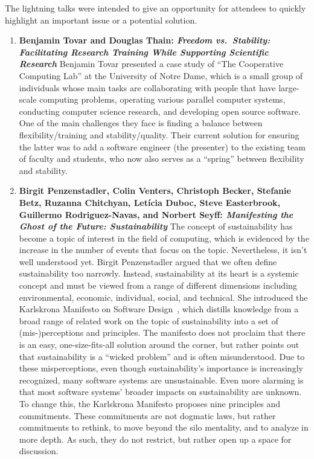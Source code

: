 \documentclass[11pt, oneside]{amsart}
\begin{document}
The lightning talks were intended to give an opportunity for attendees to
quickly highlight an important issue or a potential solution.
%
\begin{enumerate}
\item \textbf{Benjamin Tovar and Douglas Thain: \textit{Freedom vs.\ Stability:
Facilitating Research Training While Supporting Scientific Research}} Benjamin
Tovar presented a case study of ``The Cooperative Computing Lab'' at the
University of Notre Dame, which is a small group of individuals whose main tasks
are collaborating with people that have large-scale computing problems,
operating various parallel computer systems, conducting computer science
research, and developing open source software. One of the main challenges they
face is finding a balance between flexibility/training and stability/quality.
Their current solution for ensuring the latter was to add a software engineer
(the presenter) to the existing team of faculty and students, who now also
serves as a ``spring'' between flexibility and stability.

\item \textbf{Birgit Penzenstadler, Colin Venters, Christoph Becker, Stefanie
Betz, Ruzanna Chitchyan, Let\'{i}cia Duboc, Steve Easterbrook, Guillermo
Rodriguez-Navas, and Norbert Seyff: \textit{Manifesting the Ghost of the Future:
Sustainability}} The concept of sustainability has become a topic of interest in
the field of computing, which is evidenced by the increase in the number of
events that focus on the topic. Nevertheless, it isn't well understood yet.
Birgit Penzenstadler argued that we often define sustainability too narrowly.
Instead, sustainability at its heart is a systemic concept and must be viewed
from a range of different dimensions including environmental, economic,
individual, social, and technical. She introduced the Karlskrona Manifesto on
Software Design~\cite{Becker:2014}, which distills knowledge from a broad range
of related work on the topic of sustainability into a set of (mis-)perceptions
and principles. The manifesto does not proclaim that there is an easy,
one-size-fits-all solution around the corner, but rather points out that
sustainability is a ``wicked problem'' and is often misunderstood. Due to these
misperceptions, even though sustainability's importance is increasingly
recognized, many software systems are unsustainable. Even more alarming is that
most software systems' broader impacts on sustainability are unknown. To change
this, the Karlskrona Manifesto proposes nine principles and commitments. These
commitments are not dogmatic laws, but rather commitments to rethink, to move
beyond the silo mentality, and to analyze in more depth. As such, they do not
restrict, but rather open up a space for discussion.


\end{enumerate}
\end{document}
